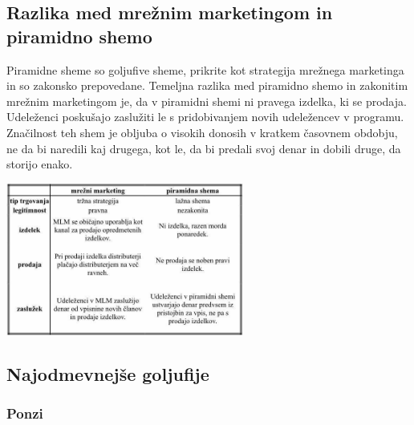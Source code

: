 \documentclass[letterpaper, titlepage, freqn]{article}
\begin{document}
\subsection{Razlika med mrežnim marketingom in piramidno shemo}
Piramidne sheme so goljufive sheme, prikrite kot strategija mrežnega marketinga in so zakonsko prepovedane. Temeljna razlika med piramidno shemo in zakonitim mrežnim marketingom je, da v piramidni shemi ni pravega izdelka, ki se prodaja. Udeleženci poskušajo zaslužiti le s pridobivanjem novih udeležencev v programu. Značilnost teh shem je obljuba o visokih donosih v kratkem časovnem obdobju, ne da bi naredili kaj drugega, kot le, da bi predali svoj denar in dobili druge, da storijo enako.

\begin{center}
\includegraphics[height=5cm]{tab}\\
\end{center}

\subsection{Najodmevnejše goljufije}

\subsubsection{Ponzi}
\end{document}
